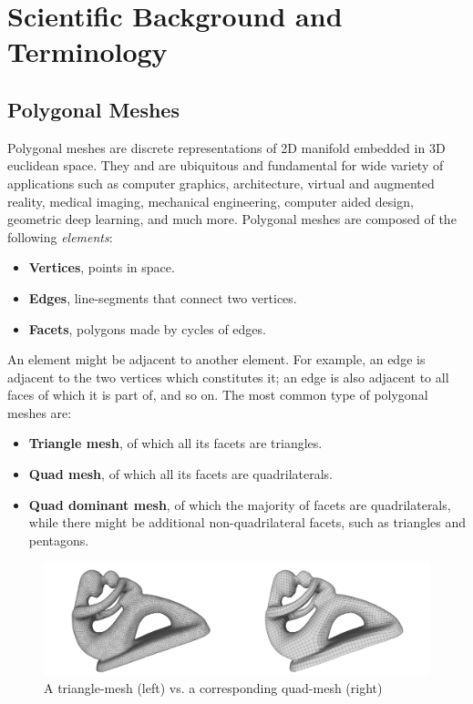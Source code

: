 \chapter{Scientific Background and Terminology}
\section{Polygonal Meshes}
Polygonal meshes are discrete representations of 2D manifold embedded in 3D euclidean space. They and are ubiquitous and fundamental for wide variety of applications such as computer graphics, architecture, virtual and augmented reality, medical imaging, mechanical engineering, computer aided design, geometric deep learning, and much more. Polygonal meshes are composed of the following \emph{elements}:
\begin{itemize}
    \item \textbf{Vertices}, points in space.
    \item \textbf{Edges}, line-segments that connect two vertices.
    \item \textbf{Facets}, polygons made by cycles of edges.
\end{itemize}
\noindent An element might be adjacent to another element. For example, an edge is adjacent to the two vertices which constitutes it; an edge is also adjacent to all faces of which it is part of, and so on. The most common type of polygonal meshes are:
\begin{itemize}
    \item \textbf{Triangle mesh}, of which all its facets are triangles.
    \item \textbf{Quad mesh}, of which all its facets are quadrilaterals.
    \item \textbf{Quad dominant mesh}, of which the majority of facets are quadrilaterals, while there might be additional non-quadrilateral facets, such as triangles and pentagons.
\end{itemize}
\begin{figure}[ht]
\centering
\includegraphics[width=15cm]{figures/tri_mesh_vs_quad_mesh.png}
\caption[Triangular mesh vs. Quad mesh]{A triangle-mesh (left) vs. a corresponding quad-mesh (right)}
\label{fig:tri_mesh_vs_quad_mesh}
\end{figure}
